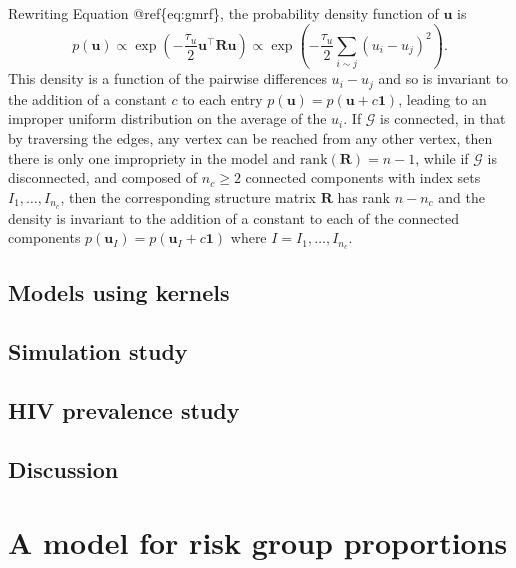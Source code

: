 \documentclass[a4paper, nobind]{templates/ociamthesis}
\newcommand{\bR}{\mathbf{R}}
\newcommand{\bu}{\mathbf{u}}
\begin{document}
Rewriting Equation @ref\{eq:gmrf\}, the probability density function of \(\bu\) is
\begin{equation}
    p(\bu)
    \propto \exp \left( -\frac{\tau_u}{2} \bu^\top \bR \bu \right)
    \propto \exp \left( -\frac{\tau_u}{2} \sum_{i \sim j} (u_i - u_j)^2 \right). \label{eq:pdfu}
\end{equation}
This density is a function of the pairwise differences \(u_i - u_j\) and so is invariant to the addition of a constant \(c\) to each entry \(p(\bu) = p(\bu + c\mathbf{1})\), leading to an improper uniform distribution on the average of the \(u_i\).
If \(\mathcal{G}\) is connected, in that by traversing the edges, any vertex can be reached from any other vertex, then there is only one impropriety in the model and \(\text{rank}(\bR) = n - 1\), while if \(\mathcal{G}\) is disconnected, and composed of \(n_c \geq 2\) connected components with index sets \(I_1, \ldots, I_{n_c}\), then the corresponding structure matrix \(\bR\) has rank \(n - n_c\) and the density is invariant to the addition of a constant to each of the connected components \(p(\bu_{I}) = p(\bu_{I} + c\mathbf{1})\) where \(I = I_1, \ldots, I_{n_c}\).

\hypertarget{models-using-kernels}{%
\section{Models using kernels}\label{models-using-kernels}}

\hypertarget{simulation-study}{%
\section{Simulation study}\label{simulation-study}}

\hypertarget{hiv-prevalence-study}{%
\section{HIV prevalence study}\label{hiv-prevalence-study}}

\hypertarget{discussion}{%
\section{Discussion}\label{discussion}}

\hypertarget{multi-agyw}{%
\chapter{A model for risk group proportions}\label{multi-agyw}}
\end{document}
